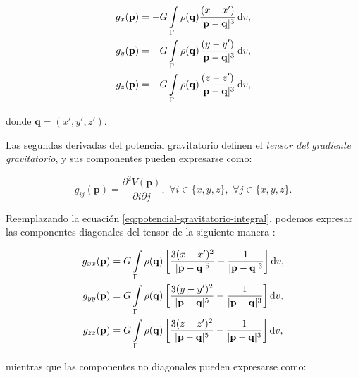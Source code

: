 \begin{align}
    g_x(\mathbf{p}) &=
        - G \int\limits_\Gamma \rho(\mathbf{q})
        \frac{(x - x')}{|\mathbf{p} - \mathbf{q}|^3} \mathop{}\!\textnormal{d} v,
    \label{eq:gx-integral}
    \\
    g_y(\mathbf{p}) &=
        - G \int\limits_\Gamma \rho(\mathbf{q})
        \frac{(y - y')}{|\mathbf{p} - \mathbf{q}|^3} \mathop{}\!\textnormal{d} v,
    \label{eq:gy-integral}
    \\
    g_z(\mathbf{p}) &=
        - G \int\limits_\Gamma \rho(\mathbf{q})
        \frac{(z - z')}{|\mathbf{p} - \mathbf{q}|^3} \mathop{}\!\textnormal{d} v,
    \label{eq:gz-integral}
\end{align}

\noindent donde $\mathbf{q} = (x', y', z')$.

Las segundas derivadas del potencial gravitatorio definen el \emph{tensor del
gradiente gravitatorio}, y sus componentes pueden expresarse como:

\begin{equation}
    g_{ij}(\mathbf{p}) =
        \frac{\partial^2 V(\mathbf{p})}{\partial i \partial j}, \,\,
        \forall i \in \{x, y, z\}, \,\,
        \forall j \in \{x, y, z\}.
\end{equation}

Reemplazando la ecuación \ref{eq:potencial-gravitatorio-integral}, podemos
expresar las componentes diagonales del tensor de la siguiente manera
\citep{grombein2013}:

\begin{align}
    g_{xx}(\mathbf{p}) &=
        G \int\limits_\Gamma \rho(\mathbf{q})
        \left[
        \frac{3(x - x')^2}{|\mathbf{p} - \mathbf{q}|^5}
        - \frac{1}{|\mathbf{p} - \mathbf{q}|^3}
        \right]
        \mathop{}\!\textnormal{d} v,
    \label{eq:gxx-integral}
    \\
    g_{yy}(\mathbf{p}) &=
        G \int\limits_\Gamma \rho(\mathbf{q})
        \left[
        \frac{3(y - y')^2}{|\mathbf{p} - \mathbf{q}|^5}
        - \frac{1}{|\mathbf{p} - \mathbf{q}|^3}
        \right]
        \mathop{}\!\textnormal{d} v,
    \label{eq:gyy-integral}
    \\
    g_{zz}(\mathbf{p}) &=
        G \int\limits_\Gamma \rho(\mathbf{q})
        \left[
        \frac{3(z - z')^2}{|\mathbf{p} - \mathbf{q}|^5}
        - \frac{1}{|\mathbf{p} - \mathbf{q}|^3}
        \right]
        \mathop{}\!\textnormal{d} v,
    \label{eq:gzz-integral}
\end{align}

\noindent mientras que las componentes no diagonales pueden expresarse como:

